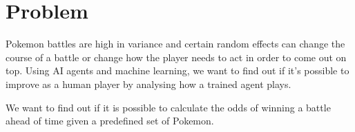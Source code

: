 \section{Problem}
\label{sec:problem-description}

Pokemon battles are high in variance and certain random effects can change
the course of a battle or change how the player needs to act in order to
come out on top. Using AI agents and machine learning, we want to find out
if it's possible to improve as a human player by analysing how a trained
agent plays. 

We want to find out if it is possible to calculate the odds 
of winning a battle ahead of time given a predefined set of Pokemon.

